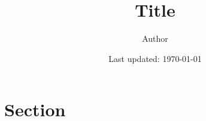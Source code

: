 \documentclass{article}
\title{Title}
\author{Author}
\date{Last updated: \today}
\begin{document}
\maketitle

\section{Section}
\end{document}
